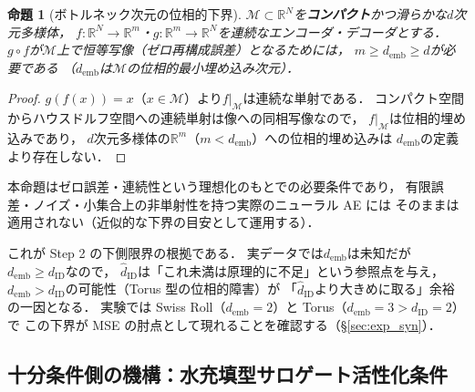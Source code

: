 \documentclass[11pt,a4paper]{jsarticle}
\newtheorem{proposition}{命題}
\newcommand{\dID}{d_{\mathrm{ID}}}
\newcommand{\hatdID}{\hat{d}_{\mathrm{ID}}}
\newcommand{\R}{\mathbb{R}}
\newcommand{\demb}{d_{\mathrm{emb}}}
\begin{document}
\begin{proposition}[ボトルネック次元の位相的下界]\label{thm:lower_bound}
$\mathcal{M} \subset \R^N$を\textbf{コンパクト}かつ滑らかな$d$次元多様体，
$f: \R^N \to \R^m$・$g: \R^m \to \R^N$を連続なエンコーダ・デコーダとする．
$g \circ f$が$\mathcal{M}$上で恒等写像（ゼロ再構成誤差）となるためには，
$m \geq \demb \geq d$が必要である
（$\demb$は$\mathcal{M}$の位相的最小埋め込み次元）．
\end{proposition}

\begin{proof}
$g(f(x)) = x$（$x \in \mathcal{M}$）より$f|_\mathcal{M}$は連続な単射である．
コンパクト空間からハウスドルフ空間への連続単射は像への同相写像なので，
$f|_\mathcal{M}$は位相的埋め込みであり，
$d$次元多様体の$\R^m$（$m < \demb$）への位相的埋め込みは
$\demb$の定義より存在しない\cite{hatcher2002algebraic}．
\end{proof}

本命題はゼロ誤差・連続性という理想化のもとでの必要条件であり，
有限誤差・ノイズ・小集合上の非単射性を持つ実際のニューラル AE には
そのままは適用されない（近似的な下界の目安として運用する）．

これが Step 2 の下側限界の根拠である．
実データでは$\demb$は未知だが$\demb \geq \dID$なので，
$\hatdID$は「これ未満は原理的に不足」という参照点を与え，
$\demb > \dID$の可能性（Torus 型の位相的障害）が
「$\hatdID$より大きめに取る」余裕の一因となる．
実験では Swiss Roll（$\demb = 2$）と Torus（$\demb = 3 > \dID = 2$）で
この下界が MSE の肘点として現れることを確認する（§\ref{sec:exp_syn}）．

\subsection{十分条件側の機構：水充填型サロゲート活性化条件}\label{sec:theory_wf}
\end{document}

